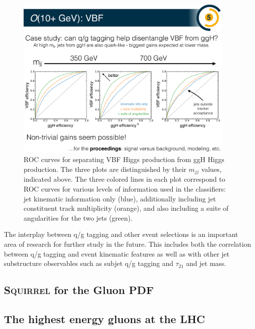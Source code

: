 \documentclass[11pt]{cernrep}
\begin{document}
\begin{figure}[h!]
\centering
\includegraphics[width=0.95\textwidth]{figs/qgstudy.pdf}
\caption{ROC curves for separating VBF Higgs production from ggH Higgs production.  The three plots are distinguished by their $m_{jj}$ values, indicated above.  The three colored lines in each plot correspond to ROC curves for various levels of information used in the classifiers: jet kinematic information only (blue), additionally including jet constituent track multiplicity (orange), and also including a suite of angularities for the two jets (green).}
\label{fig:jets:qg}
\end{figure}

The interplay between q/g tagging and other event selections is an important area of research for further study in the future.  This includes both the correlation between q/g tagging and event kinematic features as well as with other jet substructure observables such as subjet q/g tagging and $\tau_{21}$ and jet mass.

\subsection{\textsc{Squirrel} for the Gluon PDF}
\label{sec:jets:pdf}



\subsection{The highest energy gluons at the LHC}
\label{sec:jets:highest}
\end{document}
